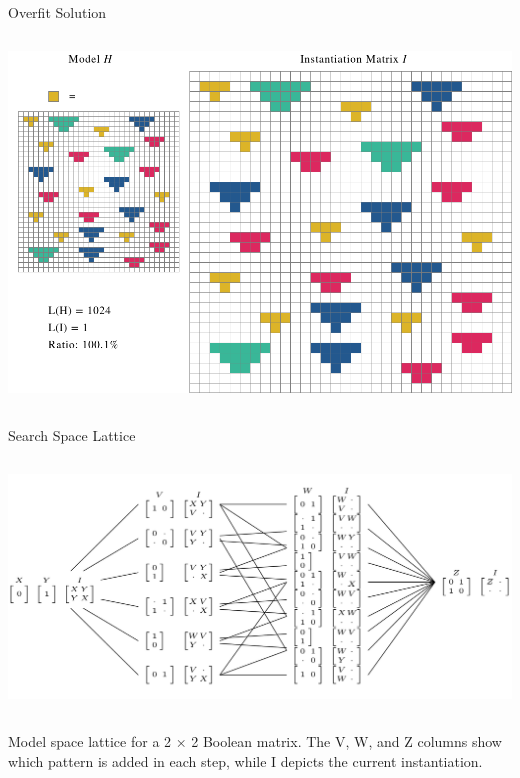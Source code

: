 \documentclass[11pt]{beamer}
\begin{document}
\begin{frame}{Overfit Solution}
\nointerlineskip%
\begin{columns}
\column{\dimexpr\paperwidth}
\centering
\includegraphics[scale=.3]{"triangles_overfit"} 
\end{columns}
\end{frame}


\begin{frame}{Search Space Lattice}
\nointerlineskip%
\begin{columns}
\column{\dimexpr\paperwidth}
\centering
\includegraphics[scale=.25]{"lattice"} 
\end{columns}
\small Model space lattice for a 2 × 2 Boolean matrix. The V, W, and Z columns show which pattern is added in each step, while I depicts the current instantiation.
\end{frame}

\end{document}
